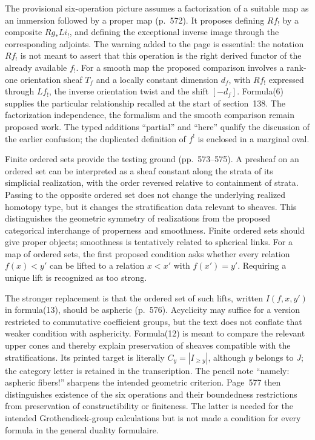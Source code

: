 The provisional six-operation picture assumes a factorization of a suitable map as an immersion followed by a proper map (p.~572). It proposes defining $Rf_!$ by a composite $Rg_*Li_!$, and defining the exceptional inverse image through the corresponding adjoints. The warning added to the page is essential: the notation $Rf_!$ is not meant to assert that this operation is the right derived functor of the already available $f_!$. For a smooth map the proposed comparison involves a rank-one orientation sheaf $T_f$ and a locally constant dimension $d_f$, with $Rf_!$ expressed through $Lf_!$, the inverse orientation twist and the shift $[-d_f]$. Formula(6) supplies the particular relationship recalled at the start of section~138. The factorization independence, the formalism and the smooth comparison remain proposed work. The typed additions ``partial'' and ``here'' qualify the discussion of the earlier confusion; the duplicated definition of $f^!$ is enclosed in a marginal oval.

Finite ordered sets provide the testing ground (pp.~573--575). A presheaf on an ordered set can be interpreted as a sheaf constant along the strata of its simplicial realization, with the order reversed relative to containment of strata. Passing to the opposite ordered set does not change the underlying realized homotopy type, but it changes the stratification data relevant to sheaves. This distinguishes the geometric symmetry of realizations from the proposed categorical interchange of properness and smoothness. Finite ordered sets should give proper objects; smoothness is tentatively related to spherical links. For a map of ordered sets, the first proposed condition asks whether every relation $f(x)<y'$ can be lifted to a relation $x<x'$ with $f(x')=y'$. Requiring a unique lift is recognized as too strong.

The stronger replacement is that the ordered set of such lifts, written $I(f,x,y')$ in formula(13), should be aspheric (p.~576). Acyclicity may suffice for a version restricted to commutative coefficient groups, but the text does not conflate that weaker condition with asphericity. Formula(12) is meant to compare the relevant upper cones and thereby explain preservation of sheaves compatible with the stratifications. Its printed target is literally $C_y=|I_{\geq y}|$, although $y$ belongs to $J$; the category letter is retained in the transcription. The pencil note ``namely: aspheric fibers!'' sharpens the intended geometric criterion. Page~577 then distinguishes existence of the six operations and their boundedness restrictions from preservation of constructibility or finiteness. The latter is needed for the intended Grothendieck-group calculations but is not made a condition for every formula in the general duality formulaire.

